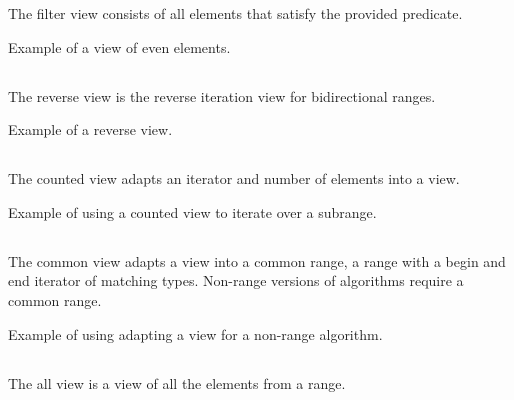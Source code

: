 The filter view consists of all elements that satisfy the provided predicate.

\begin{box-note}
\footnotesize Example of a view of even elements.
\tcblower
{}
\end{box-note}

\subsection{\texorpdfstring{}{\texttt{std::views::reverse}}}

The reverse view is the reverse iteration view for bidirectional ranges.

\begin{box-note}
\footnotesize Example of a reverse view.
\tcblower
{}
\end{box-note}

\subsection{\texorpdfstring{}{\texttt{std::views::counted}}}

The counted view adapts an iterator and number of elements into a view.

\begin{box-note}
\footnotesize Example of using a counted view to iterate over a subrange.
\tcblower
{}
\end{box-note}

\subsection{\texorpdfstring{}{\texttt{std::views::common}}}

The common view adapts a view into a common range, a range with a begin and end iterator of matching types. Non-range versions of algorithms require a common range.

\begin{box-note}
\footnotesize Example of using adapting a view for a non-range algorithm.
\tcblower
{}
\end{box-note}

\subsection{\texorpdfstring{}{\texttt{std::views::all}}}

The all view is a view of all the elements from a range.
